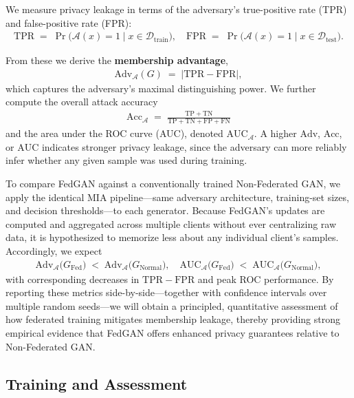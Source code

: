 \documentclass{article}
\begin{document}
We measure privacy leakage in terms of the adversary's true-positive rate (TPR) and false-positive rate (FPR):
\begin{align}
\mathrm{TPR} \;=\; \Pr\bigl(\mathcal{A}(x)=1 \mid x\in\mathcal{D}_{\mathrm{train}}\bigr), \quad \mathrm{FPR} \;=\; \Pr\bigl(\mathcal{A}(x)=1 \mid x\in\mathcal{D}_{\mathrm{test}}\bigr).
\end{align}

From these we derive the \textbf{membership advantage},
\begin{align}
\mathrm{Adv}_{\mathcal{A}}(G) \;=\; \bigl|\mathrm{TPR} - \mathrm{FPR}\bigr|,
\end{align}
which captures the adversary's maximal distinguishing power. We further compute the overall attack accuracy
\begin{align}
\mathrm{Acc}_{\mathcal{A}} \;=\; \frac{\mathrm{TP} + \mathrm{TN}}{\mathrm{TP} + \mathrm{TN} + \mathrm{FP} + \mathrm{FN}}
\end{align}
and the area under the ROC curve (AUC), denoted $\mathrm{AUC}_{\mathcal{A}}$. A higher $\mathrm{Adv}$, $\mathrm{Acc}$, or $\mathrm{AUC}$ indicates stronger privacy leakage, since the adversary can more reliably infer whether any given sample was used during training.

To compare FedGAN against a conventionally trained Non-Federated GAN, we apply the identical MIA pipeline—same adversary architecture, training-set sizes, and decision thresholds—to each generator. Because FedGAN's updates are computed and aggregated across multiple clients without ever centralizing raw data, it is hypothesized to memorize less about any individual client's samples. Accordingly, we expect
\begin{align}
\mathrm{Adv}_{\mathcal{A}}\bigl(G_{\mathrm{Fed}}\bigr)\;<\;\mathrm{Adv}_{\mathcal{A}}\bigl(G_{\mathrm{Normal}}\bigr), \quad \mathrm{AUC}_{\mathcal{A}}\bigl(G_{\mathrm{Fed}}\bigr)\;<\;\mathrm{AUC}_{\mathcal{A}}\bigl(G_{\mathrm{Normal}}\bigr),
\end{align}
with corresponding decreases in $\mathrm{TPR}-\mathrm{FPR}$ and peak ROC performance. By reporting these metrics side-by-side—together with confidence intervals over multiple random seeds—we will obtain a principled, quantitative assessment of how federated training mitigates membership leakage, thereby providing strong empirical evidence that FedGAN offers enhanced privacy guarantees relative to Non-Federated GAN.

\subsection{Training and Assessment}
\end{document}
